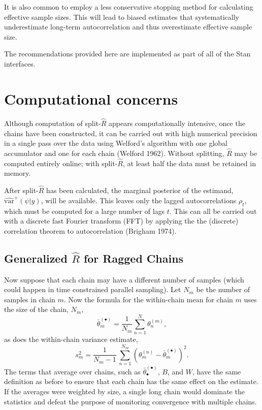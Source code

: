 \documentclass[11pt]{article}
\begin{document}
It is also common to employ a less conservative stopping method for calculating effective sample sizes.  This will lead to biased estimates that systematically underestimate long-term autocorrelation and thus overestimate effective sample size.

The recommendations provided here are implemented as part of all of the Stan interfaces.

\section{Computational concerns}

Although computation of split-$\widehat{R}$ appears computationally intensive, once the chains have been constructed, it can be carried out with high numerical precision in a single pass over the data using Welford's algorithm with one global accumulator and one for each chain (Welford 1962).  Without splitting, $\widehat{R}$ may be computed entirely online; with split-$\widehat{R}$, at least half the data must be retained in memory.

After split-$\widehat{R}$ has been calculated, the marginal posterior of the estimand, $\widehat{\mathrm{var}}^+(\psi | y)$, will be available.  This leaves only the lagged autocorrelations $\rho_t$, which must be computed for a large number of lags $t$. This can all be carried out with a discrete fast Fourier transform (FFT) by applying the the (discrete) correlation theorem to autocorrelation (Brigham 1974).

\subsection{Generalized $\hat{R}$ for Ragged Chains}

Now suppose that each chain may have a different number of samples (which could happen in time constrained parallel sampling).
Let $N_m$ be the number of samples in chain $m$.  Now the formula for
the within-chain mean for chain $m$ uses the size of the chain, $N_m$,
\[
\bar{\theta}_m^{(\bullet)}
= \frac{1}{N_m} \sum_{n = 1}^N \theta^{(m)}_n,
\]
as does the within-chain variance estimate,
\[
s_m^2 = \frac{1}{N_m-1} \, \sum_{n=1}^{N_m} (\theta^{(n)}_m - \bar{\theta}^{(\bullet)}_m)^2.
\]
The terms that average over chains, such as
$\bar{\theta}^{(\bullet)}_{\bullet}$, $B$, and $W$, have the same
definition as before to ensure that each chain has the same effect on
the estimate.  If the averages were weighted by size, a single long
chain would dominate the statistics and defeat the purpose of
monitoring convergence with multiple chains.
\end{document}
